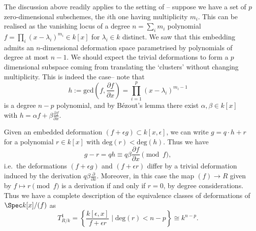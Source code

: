 \begin{example}
    The discussion above readily applies to the setting of --
    suppose we have a set of \(p\) zero-dimensional subschemes, the \(i\)th one
    having multiplicity \(m_i\). This can be realised as the vanishing locus of
    a degree \(n=\sum_i m_i\) polynomial \(f=\prod_{i}(x-\lambda_i)^{m_i}\in
    k[x]\) for \(\lambda_i\in k\) distinct. We saw that this embedding admits an
    \(n\)-dimensional deformation space parametrised by polynomials of degree at
    most \(n-1\). We should expect the trivial deformations to form a \(p\)
    dimensional subspace coming from translating the `clusters' without changing
    multiplicity. This is indeed the case-- note that
    \[h:=\text{gcd}\left(f,\frac{\partial f}{\partial
    x}\right)=\prod_{i=1}^p(x-\lambda_i)^{m_i-1}\] is a degree \(n-p\)
    polynomial, and by B\'ezout's lemma there exist $\alpha,\beta\in k[x]$ with
    \(h=\alpha f+\beta\frac{\partial f}{\partial x}.\) 

    Given an embedded deformation \((f+\epsilon g)\subset k[x,\epsilon]\), we
    can write \(g=q\cdot h + r\) for a polynomial \(r\in k[x]\) with
    \(\text{deg}(r)<\text{deg}(h)\). Thus we have \[g-r = qh \equiv q\beta
        \frac{\partial f}{\partial x} \pmod{f},\] i.e.\ the deformations
        \((f+\epsilon g)\) and \((f+\epsilon r)\) differ by a trivial
        deformation induced by the derivation \(q\beta \frac{\partial}{\partial
        x}\). Moreover, in this case the map \((f)\to R\) given by \(f\mapsto
        r\pmod f\) is a derivation if and only if \(r=0\), by degree
        considerations. Thus we have a complete description of the equivalence
        classes of deformations of \(\Spec k[x]/(f)\) as \[T^1_{R/k} =
        \left\{\frac{k[\epsilon,x]}{f+\epsilon r}\;|\; \text{deg}(r)<n-p\right\}
    \cong k^{n-p}.\]
\end{example}

